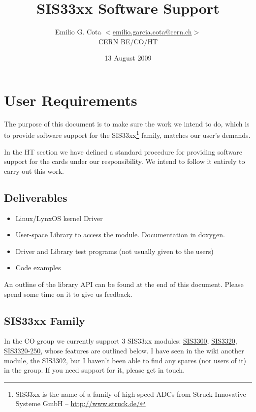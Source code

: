 \documentclass[12pt,a4paper]{article}
\title{SIS33xx Software Support}
\author{Emilio G. Cota $<$\href{mailto:emilio.garcia.cota@cern.ch}
  {emilio.garcia.cota@cern.ch}$>$ \\ CERN BE/CO/HT}
\date{13 August 2009}
\begin{document}
\maketitle


\section*{User Requirements}
\label{sec-1}

The purpose of this document is to make sure the work we intend to do, which
is to provide software support for the SIS33xx\footnote{SIS33xx is the name of
  a family of high-speed ADCs from Struck Innovative Systeme GmbH --
  \href{http://www.struck.de/}{http://www.struck.de/} } family, matches our
user's demands.

In the HT section we have defined a standard procedure for providing software
support for the cards under our responsibility. We intend to follow it
entirely to carry out this work.

\subsection*{Deliverables}
\label{sec-1.1}

\begin{itemize}
\item Linux/LynxOS kernel Driver
\item User-space Library to access the module. Documentation in doxygen.
\item Driver and Library test programs (not usually given to the users)
\item Code examples
\end{itemize}
An outline of the library API can be found at the end of this document. Please
spend some time on it to give us feedback.

\subsection*{SIS33xx Family}
\label{sec-1.2}

In the CO group we currently support 3 SIS33xx modules:
\href{http://wikis/display/HT/SIS3300+-+65-100+MHz+VME+FADCs}{SIS3300},
\href{http://wikis/display/HT/SIS3320+-+210+MHz+12-bit+VME+Digitizer}{SIS3320},
\href{http://wikis/display/HT/SIS3320+v250+-+250+MHz+12-bit+VME+Digitizer}
     {SIS3320-250},
whose features are outlined below. I have seen in the wiki another module,
the \href{http://wikis/display/HT/SIS3302+-+100+MHz+16-bit+VME+Digitizer}
{SIS3302},
but I haven't been able to find any spares (nor users of it) in the group.
If you need support for it, please get in touch.
\end{document}
